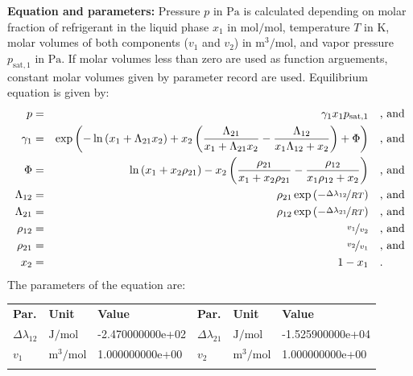 \textbf{Equation and parameters:}
\newline
%
Pressure $p$ in $\si{\pascal}$ is calculated depending on molar fraction of refrigerant in the liquid phase $x_1$ in $\si{\mole\per\mole}$, temperature $T$ in $\si{\kelvin}$, molar volumes of both components ($v_1$ and $v_2$) in $\si{\cubic\meter\per\mole}$, and vapor pressure $p_\mathrm{sat,1}$ in $\si{\pascal}$. If molar volumes less than zero are used as function arguements, constant molar volumes given by parameter record are used. Equilibrium equation is given by:
%
\begin{equation*}
\begin{split}
p &=& \gamma_1 x_1 p_\mathrm{sat,1} & \quad\text{, and} \\
\gamma_1 &=& \exp \left( - \ln \left( x_1 + \Lambda_{21} x_2 \right) + x_2 \left( \frac{\Lambda_{21}}{x_1 + \Lambda_{21} x_2} - \frac{\Lambda_{12}}{x_1 \Lambda_{12} + x_2} \right) + \Phi \right) & \quad\text{, and} \\
\Phi &=& \ln \left( x_1 + x_2 \rho_{21} \right) - x_2 \left( \frac{\rho_{21}}{x_1 + x_2 \rho_{21}} - \frac{\rho_{12}}{x_1 \rho_{12} + x_2} \right) & \quad\text{, and} \\
\Lambda_{12} &=& \rho_{21} \exp \left( - \nicefrac{\Delta\lambda_{12}}{R T} \right) & \quad\text{, and} \\
\Lambda_{21} &=& \rho_{12} \exp \left( - \nicefrac{\Delta\lambda_{21}}{R T} \right) & \quad\text{, and} \\
\rho_{12} &=& \nicefrac{v_1}{v_2} & \quad\text{, and} \\
\rho_{21} &=& \nicefrac{v_2}{v_1} & \quad\text{, and} \\
x_2 &=& 1 - x_1  & \quad\text{.} \\
\end{split}
\end{equation*}
%
The parameters of the equation are:
%
\begin{longtable}[l]{lll|lll}
\toprule
\addlinespace
\textbf{Par.} & \textbf{Unit} & \textbf{Value} &	\textbf{Par.} & \textbf{Unit} & \textbf{Value} \\
\addlinespace
\midrule
\endhead

\bottomrule
\endfoot
\bottomrule
\endlastfoot
\addlinespace

$\Delta\lambda_{12}$ & $\si{\joule\per\mole}$ & -2.470000000e+02 & $\Delta\lambda_{21}$ & $\si{\joule\per\mole}$ & -1.525900000e+04 \\
$v_1$ & $\si{\cubic\meter\per\mole}$ & 1.000000000e+00 & $v_2$ & $\si{\cubic\meter\per\mole}$ & 1.000000000e+00 \\

\addlinespace\end{longtable}

